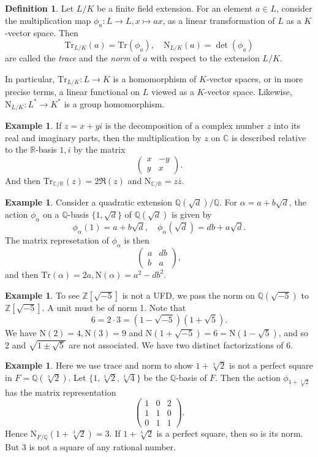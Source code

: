 \documentclass[12pt]{report}
\theoremstyle{definition}
\newtheorem{definition}[theorem]{Definition}
\newtheorem{example}[theorem]{Example}
\newcommand{\ZZ}{\mathbb{Z}}
\newcommand{\CC}{\mathbb{C}}
\newcommand{\QQ}{\mathbb{Q}}
\newcommand{\RR}{\mathbb{R}}
\newcommand{\Tr}{\text{Tr}}
\newcommand{\nm}{\text{N}}
\begin{document}
\begin{definition}\label{ntdef}
	Let $L/K$ be a finite field extension. For an element $a \in L$, consider the multiplication map $\phi_a : L \to L, x \mapsto ax$, as a linear transformation of $L$ as a $K$-vector space. Then $$\Tr_{L/K}(a)= \Tr(\phi_a),\quad \nm_{L/K}(a) = \det(\phi_a)$$ are called the \emph{trace} and the \emph{norm} of $a$ with respect to the extension $L/K$.
\end{definition}

In particular, $\Tr_{L/K} : L \to K$ is a homomorphism of $K$-vector spaces, or in more precise terms, a linear functional on $L$ viewed as a $K$-vector space. Likewise, $\nm_{L/K} : L^* \to K^*$ is a group homomorphism.

\begin{example}
	If $z = x+yi$ is the decomposition of a complex number $z$ into its real and imaginary parts, then the multiplication by $z$ on $\CC$ is described relative to the $\RR$-basis $1, i$ by the matrix $$    \begin{pmatrix}
			x & -y \\
			y & x
		\end{pmatrix}.$$
	And then $\Tr_{\CC/\RR}(z)= 2\Re(z)$ and $\nm_{\CC/\RR} = z\overline{z}$.
\end{example}

\begin{example}
	Consider a quadratic extension $\QQ(\sqrt{d})/\QQ$. For $\alpha=a+b\sqrt{d}$, the action $\phi_\alpha$ on a $\QQ$-basis $\{1,\sqrt{d}\}$ of $\QQ(\sqrt{d})$ is given by $$\phi_\alpha(1)=a+b\sqrt{d},\quad \phi_\alpha(\sqrt{d})=db+a\sqrt{d}.$$ The matrix represetation of $\phi_\alpha$ is then $$\begin{pmatrix}
			a & db \\
			b & a
		\end{pmatrix},$$ and then $\Tr(\alpha)=2a, \nm(\alpha)=a^2-db^2.$
\end{example}

\begin{example}
	To see $\ZZ[\sqrt{-5}]$ is not a UFD, we pass the norm on $\QQ(\sqrt{-5})$ to $\ZZ[\sqrt{-5}]$. A unit must be of norm 1. Note that $$6=2\cdot 3=(1-\sqrt{-5})(1+\sqrt{5}).$$ We have $\nm(2)=4,\nm(3)=9$ and $\nm(1+\sqrt{-5})=6=\nm(1-\sqrt{5})$, and so 2 and $\sqrt{1\pm\sqrt{5}}$ are not associated. We have two distinct factorizations of 6.
\end{example}

\begin{example}
	Here we use trace and norm to show $1+\sqrt[3]{2}$ is not a perfect square in $F=\QQ(\sqrt[3]{2})$. Let $\{1,\sqrt[3]{2},\sqrt[3]{4}\}$ be the $\QQ$-basis of $F$. Then the action $\phi_{1+\sqrt[3]{2}}$ has the matrix representation $$\begin{pmatrix}
			1 & 0 & 2 \\
			1 & 1 & 0 \\
			0 & 1 & 1
		\end{pmatrix}.$$
	Hence $\nm_{F/\QQ}(1+\sqrt[3]{2}) =  3$. If $1+\sqrt[3]{2}$ is a perfect square, then so is its norm. But 3 is not a square of any rational number.
\end{example}
\end{document}

